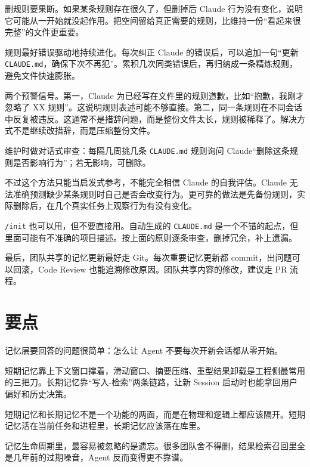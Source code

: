 \documentclass[9pt,a4paper,twocolumn]{ctexart}
\begin{document}
删规则要果断。如果某条规则存在很久了，但删掉后 Claude 行为没有变化，说明它可能从一开始就没起作用。把空间留给真正需要的规则，比维持一份“看起来很完整”的文件更重要。



规则最好错误驱动地持续进化。每次纠正 Claude 的错误后，可以追加一句“更新 \texttt{CLAUDE.md}，确保下次不再犯”。累积几次同类错误后，再归纳成一条精炼规则，避免文件快速膨胀。



两个预警信号。第一，Claude 为已经写在文件里的规则道歉，比如“抱歉，我刚才忽略了 XX 规则”。这说明规则表述可能不够直接。第二，同一条规则在不同会话中反复被违反。这通常不是措辞问题，而是整份文件太长，规则被稀释了。解决方式不是继续改措辞，而是压缩整份文件。



维护时做对话式审查：每隔几周挑几条 \texttt{CLAUDE.md} 规则询问 Claude“删除这条规则是否影响行为”；若无影响，可删除。



不过这个方法只能当启发式参考，不能完全相信 Claude 的自我评估。Claude 无法准确预测缺少某条规则时自己是否会改变行为。更可靠的做法是先备份规则，实际删除后，在几个真实任务上观察行为有没有变化。



\texttt{/init} 也可以用，但不要直接用。自动生成的 \texttt{CLAUDE.md} 是一个不错的起点，但里面可能有不准确的项目描述。按上面的原则逐条审查，删掉冗余，补上遗漏。



最后，团队共享的记忆更新最好走 Git。每次重要记忆更新都 commit，出问题可以回滚，Code Review 也能追溯修改原因。团队共享内容的修改，建议走 PR 流程。



\section*{要点}


记忆层要回答的问题很简单：怎么让 Agent 不要每次开新会话都从零开始。



短期记忆靠上下文窗口撑着，滑动窗口、摘要压缩、重型结果卸载是工程侧最常用的三把刀。长期记忆靠“写入-检索”两条链路，让新 Session 启动时也能拿回用户偏好和历史决策。




短期记忆和长期记忆不是一个功能的两面，而是在物理和逻辑上都应该隔开。短期记忆活在当前任务和进程里，长期记忆应该落在库里。



记忆生命周期里，最容易被忽略的是遗忘。很多团队舍不得删，结果检索召回里全是几年前的过期噪音，Agent 反而变得更不靠谱。
\end{document}
